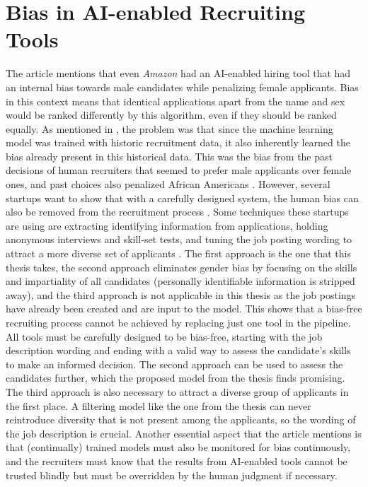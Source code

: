 \documentclass[draft,final]{thesisclass} %
\begin{document}
\section{Bias in \acs{AI}-enabled Recruiting Tools}
The article \textcite[9]{bias_ai_hiring} mentions that even \textit{Amazon} had an \acs{AI}-enabled hiring tool that had an internal bias towards male candidates while penalizing female applicants.
Bias in this context means that identical applications apart from the name and sex would be ranked differently by this algorithm, even if they should be ranked equally.
As mentioned in \textcite[9]{bias_ai_hiring}, the problem was that since the machine learning model was trained with historic recruitment data, it also inherently learned the bias already present in this historical data.
This was the bias from the past decisions of human recruiters that seemed to prefer male applicants over female ones, and past choices also penalized African Americans \parencite[9-10]{bias_ai_hiring}.
However, several startups want to show that with a carefully designed system, the human bias can also be removed from the recruitment process \parencite[9]{bias_ai_hiring}.
Some techniques these startups are using are extracting identifying information from applications, holding anonymous interviews and skill-set tests, and tuning the job posting wording to attract a more diverse set of applicants \parencite[9]{bias_ai_hiring}.
The first approach is the one that this thesis takes, the second approach eliminates gender bias by focusing on the skills and impartiality of all candidates (personally identifiable information is stripped away), and the third approach is not applicable in this thesis as the job postings have already been created and are input to the model.
This shows that a bias-free recruiting process cannot be achieved by replacing just one tool in the pipeline. All tools must be carefully designed to be bias-free, starting with the job description wording and ending with a valid way to assess the candidate's skills to make an informed decision.
The second approach can be used to assess the candidates further, which the proposed model from the thesis finds promising. The third approach is also necessary to attract a diverse group of applicants in the first place.
A filtering model like the one from the thesis can never reintroduce diversity that is not present among the applicants, so the wording of the job description is crucial.
Another essential aspect that the article \textcite[9-10]{bias_ai_hiring} mentions is that (continually) trained models must also be monitored for bias continuously, and the recruiters must know that the results from \acs{AI}-enabled tools cannot be trusted blindly but must be overridden by the human judgment if necessary.
\end{document}
